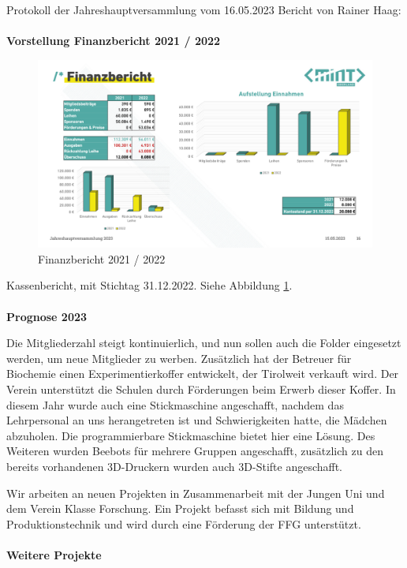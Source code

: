 \documentclass{scrartcl}
\begin{document}
\begin{Minutes}{Protokoll der Jahreshauptversammlung vom 16.05.2023}
  Bericht von Rainer Haag:\\\\
  \textbf{Vorstellung Finanzbericht 2021 / 2022}

  \begin{figure}[h!]
    \includegraphics[width=\linewidth]{finanzbericht.png}
    \caption{Finanzbericht 2021 / 2022}
    \label{fig:Finanzbericht}
  \end{figure}

  Kassenbericht, mit Stichtag 31.12.2022. Siehe Abbildung \ref{fig:Finanzbericht}.\\\\
  \textbf{Prognose 2023}

  Die Mitgliederzahl steigt kontinuierlich, und nun sollen auch die Folder eingesetzt werden, um neue Mitglieder zu werben. Zusätzlich hat der Betreuer für Biochemie einen Experimentierkoffer entwickelt, der Tirolweit verkauft wird. Der Verein unterstützt die Schulen durch Förderungen beim Erwerb dieser Koffer. In diesem Jahr wurde auch eine Stickmaschine angeschafft, nachdem das Lehrpersonal an uns herangetreten ist und Schwierigkeiten hatte, die Mädchen abzuholen. Die programmierbare Stickmaschine bietet hier eine Lösung. Des Weiteren wurden Beebots für mehrere Gruppen angeschafft, zusätzlich zu den bereits vorhandenen 3D-Druckern wurden auch 3D-Stifte angeschafft.
  
  Wir arbeiten an neuen Projekten in Zusammenarbeit mit der Jungen Uni und dem Verein Klasse Forschung. Ein Projekt befasst sich mit Bildung und Produktionstechnik und wird durch eine Förderung der FFG unterstützt.  \\\\
  \textbf{Weitere Projekte}


\end{Minutes}
\end{document}
